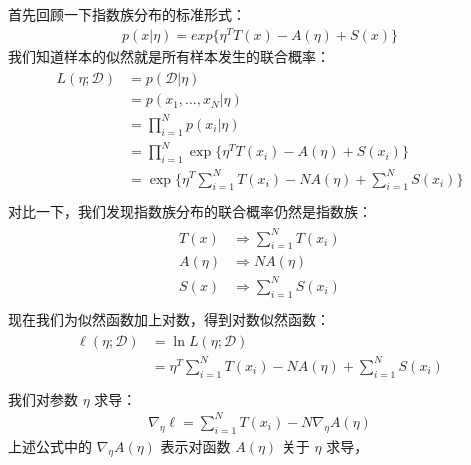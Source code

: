 \documentclass[letterpaper,10pt,english]{sphinxmanual}
\begin{document}
首先回顾一下指数族分布的标准形式：
\begin{equation}\label{equation:指数族/content:指数族/content:26}
\begin{split}p(x|\eta) =  exp \{\eta^T T(x) - A(\eta) + S(x) \}\end{split}
\end{equation}
我们知道样本的似然就是所有样本发生的联合概率：
\begin{align}\label{equation:指数族/content:指数族/content:27}\!\begin{aligned}
L(\eta;\mathcal{D}) &= p(\mathcal{D}|\eta)\\
&= p(x_1,\dots,x_N|\eta)\\
&= \prod_{i=1}^N  p(x_i|\eta)\\
&= \prod_{i=1}^N  \exp \{\eta^T T(x_i) - A(\eta) + S(x_i) \}\\
&=  \exp \{ \eta^T \sum_{i=1}^N  T(x_i) - N A(\eta) + \sum_{i=1}^N S(x_i) \}\\
\end{aligned}\end{align}
对比一下，我们发现指数族分布的联合概率仍然是指数族：
\begin{align}\label{equation:指数族/content:指数族/content:28}\!\begin{aligned}
T(x) &\Longrightarrow \sum_{i=1}^N  T(x_i)\\
A(\eta) &\Longrightarrow N A(\eta)\\
S(x) &\Longrightarrow \sum_{i=1}^N S(x_i)\\
\end{aligned}\end{align}
现在我们为似然函数加上对数，得到对数似然函数：
\begin{align}\label{equation:指数族/content:指数族/content:29}\!\begin{aligned}
\ell(\eta;\mathcal{D}) &= \ln L(\eta;\mathcal{D})\\
&=  \eta^T \sum_{i=1}^N  T(x_i) - N A(\eta) + \sum_{i=1}^N S(x_i)\\
\end{aligned}\end{align}
我们对参数 \(\eta\) 求导：
\begin{equation}\label{equation:指数族/content:指数族/content:30}
\begin{split}\nabla_{\eta} \ell = \sum_{i=1}^{N} T(x_i) - N \nabla_{\eta} A(\eta)\end{split}
\end{equation}
上述公式中的 \(\nabla_{\eta} A(\eta)\) 表示对函数 \(A(\eta)\) 关于 \(\eta\) 求导，
\end{document}
